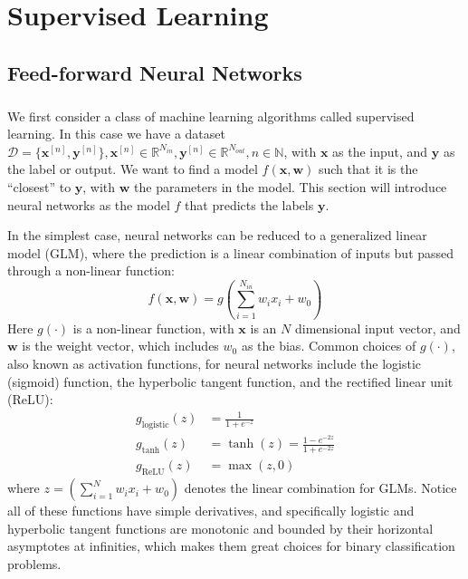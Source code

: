 
\chapter{Supervised Learning} \label{ch:supervised_learning}

\section{Feed-forward Neural Networks} \label{sc:nnet}

\paragraph{}
We first consider a class of machine learning algorithms
called supervised learning. 
In this case we have a dataset $\mathcal{D} = \{\mathbf{x}^{[n]}, 
\mathbf{y}^{[n]}\}, \mathbf{x}^{[n]} \in \mathbb{R}^{N_{in}}, 
\mathbf{y}^{[n]} \in \mathbb{R}^{N_{out}}, n \in \mathbb{N}$,
with $\mathbf{x}$ as the input, and $\mathbf{y}$ as the label 
or output.
We want to find a model 
$f(\mathbf{x},\mathbf{w})$ such that 
it is the ``closest'' to $\mathbf{y}$, 
with $\mathbf{w}$ the parameters in the model.
This section will introduce neural networks as the model $f$
that predicts the labels $\mathbf{y}$.

In the simplest case, neural networks can be reduced to 
a generalized linear model (GLM),
where the prediction is a linear combination of inputs
but passed through a non-linear function:
%
\begin{equation*}
	f(\mathbf{x},\mathbf{w}) = g\left( 
    \sum_{i=1}^{N_{in}} w_i x_i + w_0 \right)
\end{equation*}
%
\indent Here $g(\cdot)$ is a non-linear function, 
with $\mathbf{x}$ is an $N$ dimensional input vector,
and $\mathbf{w}$ is the weight vector,
which includes $w_0$ as the bias.
Common choices of $g(\cdot)$, also known as activation functions,
for neural networks 
include the logistic (sigmoid) function, the hyperbolic tangent function, 
and the rectified linear unit (ReLU):
%
\begin{equation*}
\begin{aligned}
	g_{\text{logistic}}(z) &= \frac{1}{1+e^{-z}} \\
	g_{\text{tanh}}(z) &= \tanh(z) = \frac{1 - e^{-2z}}{1 + e^{-2z}}\\
	g_\text{ReLU}(z) &= \max(z,0)
\end{aligned}
\end{equation*}
%
where $z = \left( \sum_{i=1}^N w_i x_i + w_0 \right)$ 
denotes the linear combination for GLMs.
Notice all of these functions have simple derivatives,
and specifically logistic and hyperbolic tangent functions 
are monotonic and bounded by their horizontal asymptotes at infinities,
which makes them great choices for binary classification problems.

